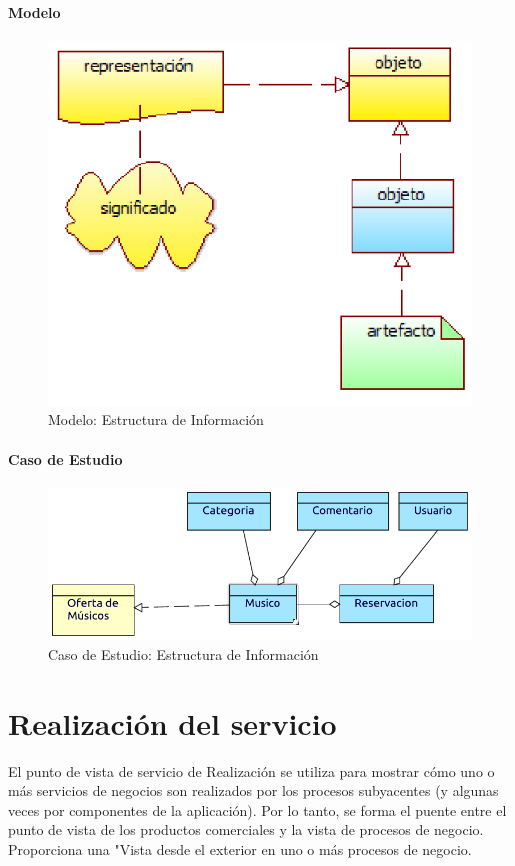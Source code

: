 \paragraph{Modelo}
\begin{figure}[h!]
	\centering
	\includegraphics[width=0.8\linewidth]{Desarrollo/ArquitecturaEmpresarial/Tecnologia/imgs/estructuraMetamodelo.PNG}
	\caption{Modelo: Estructura de Información}
\end{figure}
\newpage
\paragraph{Caso de Estudio}

\begin{figure}[h!]
	\centering
	\includegraphics[width=\linewidth]{Desarrollo/ArquitecturaEmpresarial/Tecnologia/imgs/estructura.pdf}
	\caption{Caso de Estudio: Estructura de Información}
\end{figure}

\newpage

\section{Realización del servicio}
El punto de vista de servicio de Realización se utiliza para mostrar cómo uno o más servicios de negocios son realizados por los procesos subyacentes (y algunas veces por componentes de la aplicación). Por lo tanto, se forma el puente entre el punto de vista de los productos comerciales y la vista de procesos de negocio. Proporciona una "Vista desde el exterior en uno o más procesos de negocio.  \vspace{\baselineskip}

